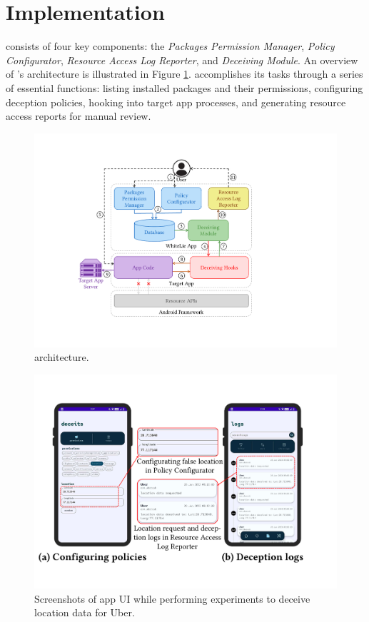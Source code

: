 \section{Implementation}
\label{sec:architecture}

\framework{} consists of four key components: the \textit{Packages Permission Manager}, \textit{Policy Configurator}, \textit{Resource Access Log Reporter}, and \textit{Deceiving Module}. An overview of \framework{}'s architecture is illustrated in Figure \ref{fig:method_frmwrkArch}. \framework{} accomplishes its tasks through a series of essential functions: listing installed packages and their permissions, configuring deception policies, hooking into target app processes, and generating resource access reports for manual review.

\begin{figure}[t]
    \centering
    \includegraphics[width=0.65\linewidth]{Figures/Methodology/deceiver_working_architecture.pdf}
    \caption{\framework{} architecture.}
    \label{fig:method_frmwrkArch}
\end{figure}

\begin{figure}[t]
    \centering
    \includegraphics[width=0.75\linewidth]{Figures/Case Studies/whitelie_screenshots.pdf}
    \caption{Screenshots of \framework{} app UI while performing experiments to deceive location data for Uber.}
    \label{fig:frmwrk-ui}
\end{figure}

